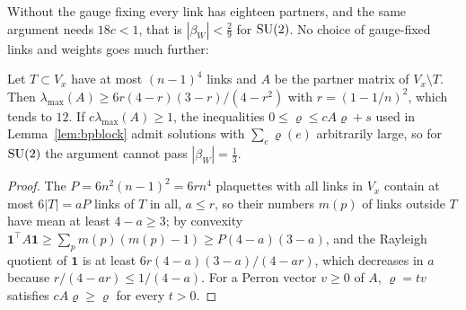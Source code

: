Without the gauge fixing every link has eighteen partners, and the same
argument needs $18c<1$, that is $|\beta_W|<\frac29$ for $\mathrm{SU}(2)$. No choice of
gauge-fixed links and weights goes much further:

\begin{proposition}\label{prop:methodlimit}
Let $T\subset V_x$ have at most $(n-1)^4$ links and $A$ be the partner matrix
of $V_x\setminus T$. Then $\lambda_{\max}(A)\ge6r(4-r)(3-r)/(4-r^2)$ with
$r=(1-1/n)^2$, which tends to $12$. If $c\lambda_{\max}(A)\ge1$, the
inequalities $0\le\varrho\le cA\varrho+s$ used in Lemma~\ref{lem:bpblock}
admit solutions with $\sum_e\varrho(e)$ arbitrarily large, so for $\mathrm{SU}(2)$ the
argument cannot pass $|\beta_W|=\frac13$.
\end{proposition}

\begin{proof}
The $P=6n^2(n-1)^2=6rn^4$ plaquettes with all links in $V_x$ contain at most
$6|T|=aP$ links of $T$ in all, $a\le r$, so their numbers $m(p)$ of links outside
$T$ have mean at least $4-a\ge3$; by convexity $\mathbf1^{\top}A\mathbf1\ge
\sum_pm(p)(m(p)-1)\ge P(4-a)(3-a)$, and the Rayleigh quotient of $\mathbf1$ is
at least $6r(4-a)(3-a)/(4-ar)$, which decreases in $a$ because
$r/(4-ar)\le1/(4-a)$. For a Perron vector $v\ge0$ of $A$, $\varrho=tv$
satisfies $cA\varrho\ge\varrho$ for every $t>0$.
\end{proof}

